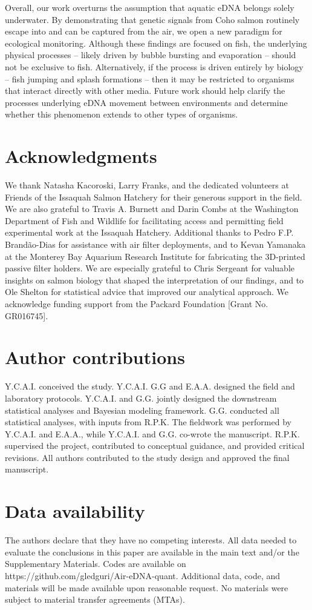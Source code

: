 \documentclass{article}
\begin{document}
Overall, our work overturns the assumption that aquatic eDNA belongs solely underwater. By demonstrating that genetic signals from Coho salmon routinely escape into and can be captured from the air, we open a new paradigm for ecological monitoring. Although these findings are focused on fish, the underlying physical processes -- likely driven by bubble bursting and evaporation -- should not be exclusive to fish. Alternatively, if the process is driven entirely by biology -- fish jumping and splash formations -- then it may be restricted to organisms that interact directly with other media. Future work should help clarify the processes underlying eDNA movement between environments and determine whether this phenomenon extends to other types of organisms.

\section*{Acknowledgments}
We thank Natasha Kacoroski, Larry Franks, and the dedicated volunteers at Friends of the Issaquah Salmon Hatchery for their generous support in the field. We are also grateful to Travis A. Burnett and Darin Combs at the Washington Department of Fish and Wildlife for facilitating access and permitting field experimental work at the Issaquah Hatchery. Additional thanks to Pedro F.P. Brandão-Dias for assistance with air filter deployments, and to Kevan Yamanaka at the Monterey Bay Aquarium Research Institute for fabricating the 3D-printed passive filter holders. We are especially grateful to Chris Sergeant for valuable insights on salmon biology that shaped the interpretation of our findings, and to Ole Shelton for statistical advice that improved our analytical approach. We acknowledge funding support from the Packard Foundation [Grant No. GR016745].

\section*{Author contributions}
Y.C.A.I. conceived the study. Y.C.A.I. G.G and E.A.A. designed the field and laboratory protocols. Y.C.A.I. and G.G. jointly designed the downstream statistical analyses and Bayesian modeling framework. G.G. conducted all statistical analyses, with inputs from R.P.K. The fieldwork was performed by Y.C.A.I. and E.A.A., while Y.C.A.I. and G.G. co-wrote the manuscript. R.P.K. supervised the project, contributed to conceptual guidance, and provided critical revisions. All authors contributed to the study design and approved the final manuscript.  

\section*{Data availability}
The authors declare that they have no competing interests. All data needed to evaluate the conclusions in this paper are available in the main text and/or the Supplementary Materials. Codes are available on https://github.com/gledguri/Air-eDNA-quant. Additional data, code, and materials will be made available upon reasonable request. No materials were subject to material transfer agreements (MTAs).

\clearpage

\end{document}

